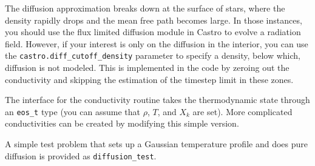 The diffusion approximation breaks down at the surface of stars,
where the density rapidly drops and the mean free path becomes 
large.  In those instances, you should use the flux limited diffusion
module in Castro to evolve a radiation field.  However, if your
interest is only on the diffusion in the interior, you can use
the {\tt castro.diff\_cutoff\_density} parameter to specify a density,
below which, diffusion is not modeled.  This is implemented in the
code by zeroing out the conductivity and skipping the estimation
of the timestep limit in these zones.


The interface for the conductivity routine takes
the thermodynamic state through an {\tt eos\_t} type (you can assume
that $\rho$, $T$, and $X_k$ are set).  More complicated conductivities
can be created by modifying this simple version.

A simple test problem that sets up a Gaussian temperature profile 
and does pure diffusion is provided as {\tt diffusion\_test}.

